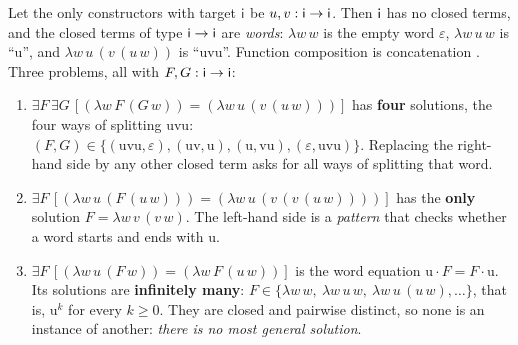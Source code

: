 {Let the only constructors with target $\mathsf{i}$ be $u,v:\mathsf{i}\to\mathsf{i}$. Then $\mathsf{i}$ has no closed
terms, and the closed terms of type $\mathsf{i}\to\mathsf{i}$ are \emph{words}: $\lambda w\,w$ is the empty word
$\varepsilon$, $\lambda w\,u\,w$ is \enquote{u}, and $\lambda w\,u\,(v\,(u\,w))$ is \enquote{uvu}. Function
composition is concatenation . Three problems, all with $F,G:\mathsf{i}\to\mathsf{i}$:
\begin{enumerate}
\item $\exists F\,\exists G\,[(\lambda w\,F\,(G\,w))=(\lambda w\,u\,(v\,(u\,w)))]$ has \textbf{four}
      solutions, the four ways of splitting uvu:
      $(F,G)\in\{(\mathrm{uvu},\varepsilon),(\mathrm{uv},\mathrm{u}),(\mathrm{u},\mathrm{vu}),(\varepsilon,\mathrm{uvu})\}$.
      Replacing the right-hand side by any other closed term asks for all ways of splitting that word.
\item $\exists F\,[(\lambda w\,u\,(F\,(u\,w)))=(\lambda w\,u\,(v\,(v\,(u\,w))))]$ has the \textbf{only}
      solution $F=\lambda w\,v\,(v\,w)$. The left-hand side is a \emph{pattern} that checks whether a word
      starts and ends with u.
\item $\exists F\,[(\lambda w\,u\,(F\,w))=(\lambda w\,F\,(u\,w))]$ is the word equation
      $\mathrm{u}\cdot F=F\cdot\mathrm{u}$. Its solutions are \textbf{infinitely many}:
      $F\in\{\lambda w\,w,\ \lambda w\,u\,w,\ \lambda w\,u\,(u\,w),\dots\}$, that is, $\mathrm{u}^k$ for every
      $k\ge 0$. They are closed and pairwise distinct, so none is an instance of another: \emph{there is
      no most general solution}.
\end{enumerate}

}

